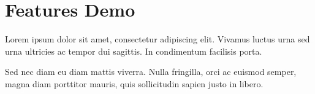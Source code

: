 \section{Features Demo}

Lorem ipsum dolor sit amet, consectetur adipiscing elit. Vivamus luctus urna sed urna ultricies ac tempor dui sagittis. In condimentum facilisis porta.

Sed nec diam eu diam mattis viverra. Nulla fringilla, orci ac euismod semper, magna diam porttitor mauris, quis sollicitudin sapien justo in libero.
